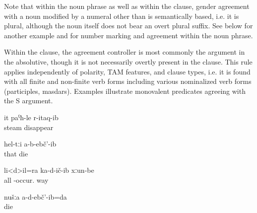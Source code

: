 Note that within the noun phrase as well as within the clause, gender agreement with a noun modified by a numeral other than  is semantically based, i.e. it is plural, although the noun itself does not bear an overt plural suffix. See  below for another example and  for number marking and agreement within the noun phrase.

Within the clause, the agreement controller is most commonly the argument in the absolutive, though it is not necessarily overtly present in the clause. This rule applies independently of polarity, TAM features, and clause types, i.e. it is found with all finite and non-finite verb forms including various nominalized verb forms (participles, masdars). Examples  illustrate monovalent predicates agreeing with the S argument. 
%
\begin{exe}

		\ex	\label{ex:She disappeared like steam@11a}
		\gll	it	paˁħ-le	r-itaq-ib\\
				steam	disappear\\
		\glt	{}

		\ex	\label{ex:They did not die@11b}
		\gll	hel-tːi	a-b-ebč'-ib\\
			that	die\\
		\glt	{}

		\ex	\label{ex:All roads broke@11c}
		\gll	li<d>il=ra	ka-d-ič-ib	xːun-be\\
			all	-occur.	way\\
		\glt	{}

		\ex	\label{ex:We did not die@11d}
		\gll	nušːa	a-d-ebč'-ib=da\\
				die\\
		\glt	{}
\end{exe}

